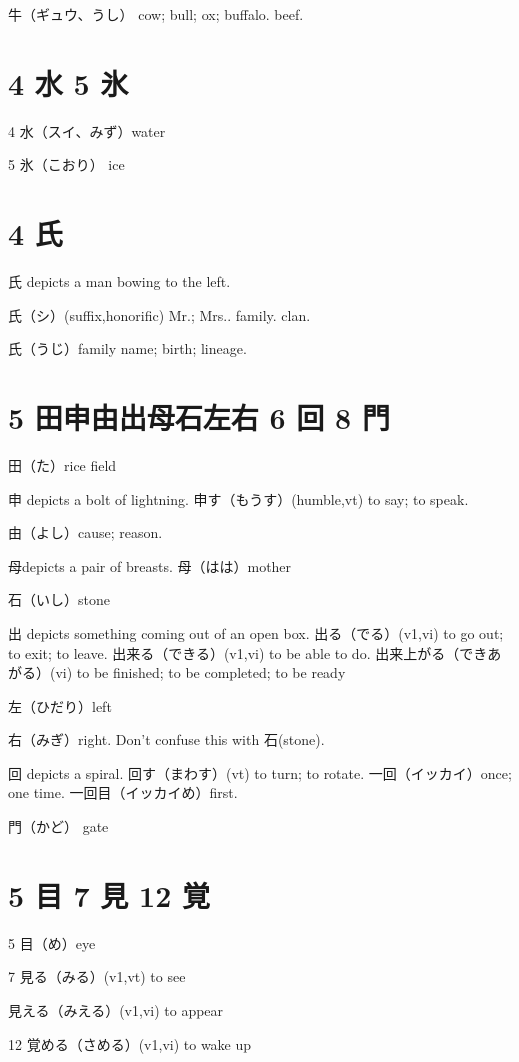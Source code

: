 牛（ギュウ、うし）
cow; bull; ox; buffalo.
beef.

\section{4 水 5 氷}

4 水（スイ、みず）water

5 氷（こおり） ice

\section{4 氏}

氏 depicts a man bowing to the left.

氏（シ）(suffix,honorific) Mr.; Mrs.. family. clan.

氏（うじ）family name; birth; lineage.

\section{5 田申由出母石左右 6 回 8 門}

田（た）rice field

申 depicts a bolt of lightning.
申す（もうす）(humble,vt) to say; to speak.

由（よし）cause; reason.

母depicts a pair of breasts.
母（はは）mother

石（いし）stone

出 depicts something coming out of an open box.
出る（でる）(v1,vi) to go out; to exit; to leave.
出来る（できる）(v1,vi) to be able to do.
出来上がる（できあがる）(vi) to be finished; to be completed; to be ready

左（ひだり）left

右（みぎ）right.
Don't confuse this with 石(stone).

回 depicts a spiral.
回す（まわす）(vt) to turn; to rotate.
一回（イッカイ）once; one time.
一回目（イッカイめ）first.

門（かど） gate

\section{5 目 7 見 12 覚}

5 目（め）eye

7 見る（みる）(v1,vt) to see

見える（みえる）(v1,vi) to appear

12 覚める（さめる）(v1,vi) to wake up

